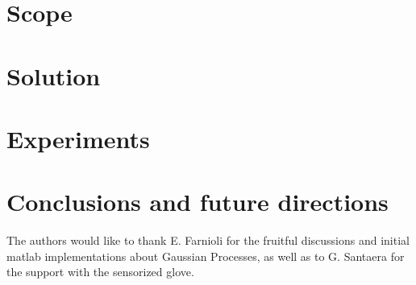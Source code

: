 \section{Scope}
\label{sec:scope}



\section{Solution}
\label{sec:solution}



\section{Experiments}
\label{sec:experiments}



\section{Conclusions and future directions}
\label{sec:conclusions}



\begin{acknowledgements}
The authors would like to thank E. Farnioli for the fruitful discussions and
initial matlab implementations about Gaussian Processes, as well as to G.
Santaera for the support with the sensorized glove.
\end{acknowledgements}






